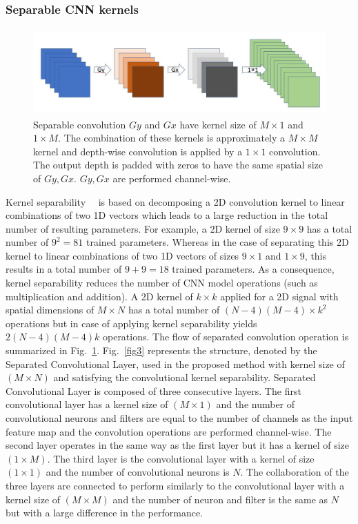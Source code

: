 \subsubsection{Separable CNN kernels}
\begin{figure}
\begin{center}
\includegraphics[height=33mm,width=14.0cm]{Figures/fig2.jpg}
\caption{Separable convolution  $Gy$ and $Gx$ have kernel size of $M\times1$ and $1 \times M$. The combination of these kernels is approximately a $M\times M$ kernel and depth-wise convolution is applied by a $1\times1$ convolution. The output depth is padded with zeros to have the same spatial size of  $Gy, Gx$. $Gy, Gx$ are performed channel-wise. }
\label{fig2}\end{center}\end{figure}


    
Kernel separability~\cite{rigamonti2013learning}~\cite{szegedy2017inception} is based on decomposing a 2D convolution kernel to linear combinations of two 1D vectors which leads to a large reduction in the total number of resulting parameters. For example, a 2D kernel of size $9 \times 9$ has a total number of $9^2 = 81$  trained parameters. Whereas in the case of separating this 2D kernel to linear combinations of two 1D vectors of sizes $9 \times 1$ and $1 \times 9$, this results in a total number of  $9 + 9 = 18$ trained parameters. As a consequence, kernel separability reduces the number of CNN model operations (such as multiplication and addition). A  2D kernel of $k \times k$ applied for a 2D signal with spatial dimensions of $ M \times N$ has a total number of  $(N-4)(M-4)\times k^2$ operations but in case of applying kernel separability yields $2(N-4)(M-4)k$ operations. The flow of separated convolution operation is summarized in Fig.~\ref{fig2}. Fig.~\ref{fig3} represents the structure, denoted by the Separated Convolutional Layer, used in the proposed method with kernel size of $(M\times N)$ and satisfying the convolutional kernel separability. Separated Convolutional Layer is composed of three consecutive layers. The first convolutional layer has a kernel size of $(M\times1)$ and the number of convolutional neurons and filters are equal to the number of channels as the input feature map and the convolution operations are performed channel-wise. The second layer operates in the same way as the first layer but it has a kernel of size $(1\times M)$. The third layer is the convolutional layer with a kernel of size $(1\times1)$ and the number of convolutional neurons is $N$. The collaboration of the three layers are connected to perform similarly to the convolutional layer with a kernel size of $(M\times M)$ and the number of neuron and filter is the same as $N$ but with a large difference in the performance.


